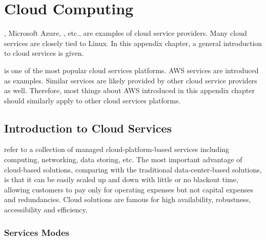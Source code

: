 \chapter{Cloud Computing} \label{apch:cloud}

, Microsoft Azure, , etc., are examples of cloud service providers. Many cloud services are closely tied to Linux. In this appendix chapter, a general introduction to cloud services is given. 

 is one of the most popular cloud services platforms. AWS services are introduced as examples. Similar services are likely provided by other cloud service providers as well. Therefore, most things about AWS introduced in this appendix chapter should similarly apply to other cloud services platforms.

\section{Introduction to Cloud Services}

 refer to a collection of managed cloud-platform-based services including computing, networking, data storing, etc. The most important advantage of cloud-based solutions, comparing with the traditional data-center-based solutions, is that it can be easily scaled up and down with little or no blackout time, allowing customers to pay only for operating expenses but not capital expenses and redundancies. Cloud solutions are famous for high availability, robustness, accessibility and efficiency.

\subsection{Services Modes}

